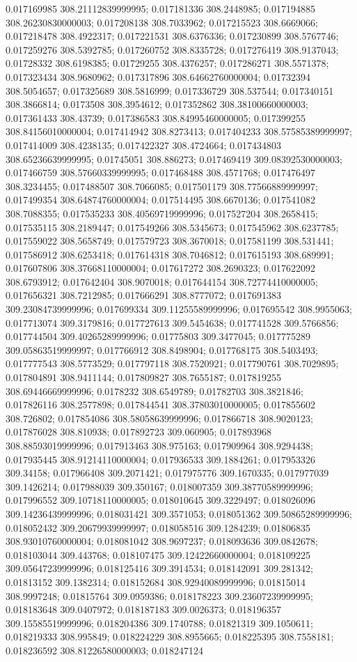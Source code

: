 0.017169985 308.21112839999995; 0.017181336 308.2448985; 0.017194885 308.26230830000003; 0.017208138 308.7033962; 0.017215523 308.6669066; 0.017218478 308.4922317; 0.017221531 308.6376336; 0.017230899 308.5767746; 0.017259276 308.5392785; 0.017260752 308.8335728; 0.017276419 308.9137043; 0.01728332 308.6198385; 0.01729255 308.4376257; 0.017286271 308.5571378; 0.017323434 308.9680962; 0.017317896 308.64662760000004; 0.01732394 308.5054657; 0.017325689 308.5816999; 0.017336729 308.537544; 0.017340151 308.3866814; 0.0173508 308.3954612; 0.017352862 308.38100660000003; 0.017361433 308.43739; 0.017386583 308.84995460000005; 0.017399255 308.84156010000004; 0.017414942 308.8273413; 0.017404233 308.57585389999997; 0.017414009 308.4238135; 0.017422327 308.4724664; 0.017434803 308.65236639999995; 0.01745051 308.886273; 0.017469419 309.08392530000003; 0.017466759 308.57660339999995; 0.017468488 308.4571768; 0.017476497 308.3234455; 0.017488507 308.7066085; 0.017501179 308.77566889999997; 0.017499354 308.64874760000004; 0.017514495 308.6670136; 0.017541082 308.7088355; 0.017535233 308.40569719999996; 0.017527204 308.2658415; 0.017535115 308.2189447; 0.017549266 308.5345673; 0.017545962 308.6237785; 0.017559022 308.5658749; 0.017579723 308.3670018; 0.017581199 308.531441; 0.017586912 308.6253418; 0.017614318 308.7046812; 0.017615193 308.689991; 0.017607806 308.37668110000004; 0.017617272 308.2690323; 0.017622092 308.6793912; 0.017642404 308.9070018; 0.017644154 308.72774410000005; 0.017656321 308.7212985; 0.017666291 308.8777072; 0.017691383 309.23084739999996; 0.017699334 309.11255589999996; 0.017695542 308.9955063; 0.017713074 309.3179816; 0.017727613 309.5454638; 0.017741528 309.5766856; 0.017744504 309.40265289999996; 0.01775803 309.3477045; 0.017775289 309.05863519999997; 0.017766912 308.8498904; 0.017768175 308.5403493; 0.017777543 308.5773529; 0.017797118 308.7520921; 0.017790761 308.7029895; 0.017804891 308.9411144; 0.017809827 308.7655187; 0.017819255 308.69446669999996; 0.0178232 308.6549789; 0.01782703 308.3821846; 0.017826116 308.2577898; 0.017844541 308.37803010000005; 0.017855602 308.726802; 0.017854086 308.58058639999996; 0.017866718 308.9020123; 0.017876028 308.810938; 0.017892723 309.060905; 0.017893968 308.88593019999996; 0.017913463 308.975163; 0.017909964 308.9294438; 0.017935445 308.91214110000004; 0.017936533 309.1884261; 0.017953326 309.34158; 0.017966408 309.2071421; 0.017975776 309.1670335; 0.017977039 309.1426214; 0.017988039 309.350167; 0.018007359 309.38770589999996; 0.017996552 309.10718110000005; 0.018010645 309.3229497; 0.018026096 309.14236439999996; 0.018031421 309.3571053; 0.018051362 309.50865289999996; 0.018052432 309.20679939999997; 0.018058516 309.1284239; 0.01806835 308.93010760000004; 0.018081042 308.9697237; 0.018093636 309.0842678; 0.018103044 309.443768; 0.018107475 309.12422660000004; 0.018109225 309.05647239999996; 0.018125416 309.3914534; 0.018142091 309.281342; 0.01813152 309.1382314; 0.018152684 308.92940089999996; 0.01815014 308.9997248; 0.01815764 309.0959386; 0.018178223 309.23607239999995; 0.018183648 309.0407972; 0.018187183 309.0026373; 0.018196357 309.15585519999996; 0.018204386 309.1740788; 0.01821319 309.1050611; 0.018219333 308.995849; 0.018224229 308.8955665; 0.018225395 308.7558181; 0.018236592 308.81226580000003; 0.018247124 